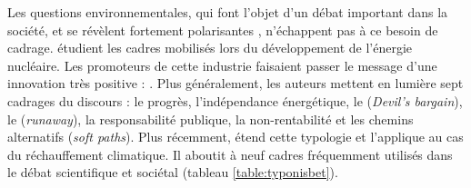             Les questions environnementales, qui font l'objet d'un débat important dans la société, et se révèlent fortement polarisantes \parencite{nisbet2009communicating}, n'échappent pas à ce besoin de cadrage. \textcite{gamson1989media} étudient les cadres mobilisés lors du développement de l'énergie nucléaire. Les promoteurs de cette industrie faisaient passer le message d'une innovation très positive :  \parencite[][p.1]{gamson1989media}. Plus généralement, les auteurs mettent en lumière sept cadrages du discours : le progrès, l'indépendance énergétique, le  (\textit{Devil's bargain}), le  (\textit{runaway}), la responsabilité publique, la non-rentabilité et les chemins alternatifs (\textit{soft paths}). Plus récemment, \textcite{nisbet2009communicating, nisbet2010framing} étend cette typologie et l'applique au cas du réchauffement climatique. Il aboutit à neuf cadres fréquemment utilisés dans le débat scientifique et sociétal (tableau \ref{table:typonisbet}).

